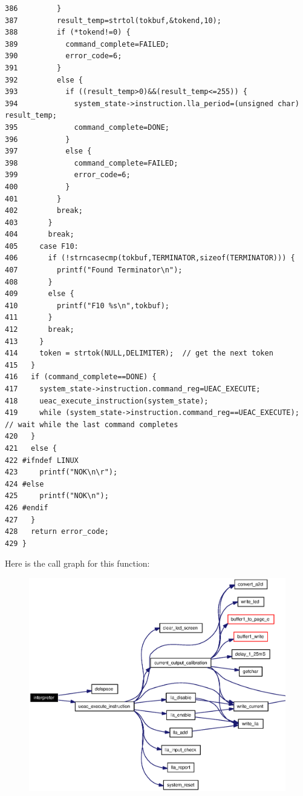 \begin{verbatim}
386         }
387         result_temp=strtol(tokbuf,&tokend,10);
388         if (*tokend!=0) {
389           command_complete=FAILED;
390           error_code=6;
391         }
392         else {
393           if ((result_temp>0)&&(result_temp<=255)) {
394             system_state->instruction.lla_period=(unsigned char) result_temp;
395             command_complete=DONE;
396           }
397           else {
398             command_complete=FAILED;
399             error_code=6;
400           }
401         }
402         break;
403       }
404       break;
405     case F10:
406       if (!strncasecmp(tokbuf,TERMINATOR,sizeof(TERMINATOR))) {
407         printf("Found Terminator\n");
408       }
409       else {
410         printf("F10 %s\n",tokbuf);
411       }
412       break;
413     }
414     token = strtok(NULL,DELIMITER);  // get the next token 
415   }
416   if (command_complete==DONE) {
417     system_state->instruction.command_reg=UEAC_EXECUTE;
418     ueac_execute_instruction(system_state);
419     while (system_state->instruction.command_reg==UEAC_EXECUTE); // wait while the last command completes
420   }
421   else {
422 #ifndef LINUX 
423     printf("NOK\n\r");
424 #else
425     printf("NOK\n");
426 #endif 
427   }
428   return error_code;
429 }
\end{verbatim}\normalsize 




Here is the call graph for this function:\begin{figure}[H]
\begin{center}
\leavevmode
\includegraphics[width=333pt]{interpreter_8h_a2_cgraph}
\end{center}
\end{figure}

